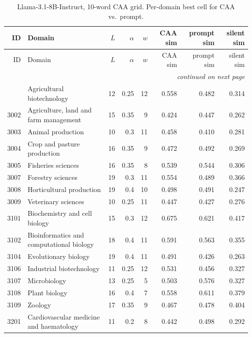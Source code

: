 \begingroup
\scriptsize
\setlength{\tabcolsep}{3pt}
\setlength{\LTcapwidth}{\textwidth}

\begin{longtable}{r p{3.35cm} rr r rrr}
\caption{Llama-3.1-8B-Instruct, 10-word CAA grid. Per-domain best cell for CAA vs.\ prompt.}
\label{tab:app-8b-10w} \\
\toprule
ID & Domain & $L$ & $\alpha$ & $w$ & CAA sim & prompt sim & silent sim \\
\midrule
\endfirsthead
\toprule
ID & Domain & $L$ & $\alpha$ & $w$ & CAA sim & prompt sim & silent sim \\
\midrule
\endhead
\midrule
\multicolumn{8}{r}{\emph{continued on next page}} \\
\endfoot
\bottomrule
\endlastfoot
3001 & Agricultural biotechnology & 12 & 0.25 & 12 & 0.558 & 0.482 & 0.314 \\
3002 & Agriculture, land and farm management & 15 & 0.35 & 9 & 0.424 & 0.447 & 0.262 \\
3003 & Animal production & 10 & 0.3 & 11 & 0.458 & 0.410 & 0.281 \\
3004 & Crop and pasture production & 16 & 0.35 & 9 & 0.472 & 0.492 & 0.269 \\
3005 & Fisheries sciences & 16 & 0.35 & 8 & 0.539 & 0.544 & 0.306 \\
3007 & Forestry sciences & 19 & 0.3 & 11 & 0.554 & 0.489 & 0.366 \\
3008 & Horticultural production & 19 & 0.4 & 10 & 0.498 & 0.491 & 0.247 \\
3009 & Veterinary sciences & 10 & 0.25 & 11 & 0.447 & 0.427 & 0.276 \\
3101 & Biochemistry and cell biology & 15 & 0.3 & 12 & 0.675 & 0.621 & 0.417 \\
3102 & Bioinformatics and computational biology & 18 & 0.4 & 11 & 0.591 & 0.563 & 0.355 \\
3104 & Evolutionary biology & 19 & 0.4 & 11 & 0.491 & 0.426 & 0.263 \\
3106 & Industrial biotechnology & 11 & 0.25 & 12 & 0.531 & 0.456 & 0.327 \\
3107 & Microbiology & 13 & 0.25 & 5 & 0.503 & 0.576 & 0.327 \\
3108 & Plant biology & 16 & 0.4 & 7 & 0.558 & 0.611 & 0.379 \\
3109 & Zoology & 17 & 0.35 & 9 & 0.467 & 0.478 & 0.404 \\
3201 & Cardiovascular medicine and haematology & 11 & 0.2 & 8 & 0.442 & 0.498 & 0.292 \\

\end{longtable}
